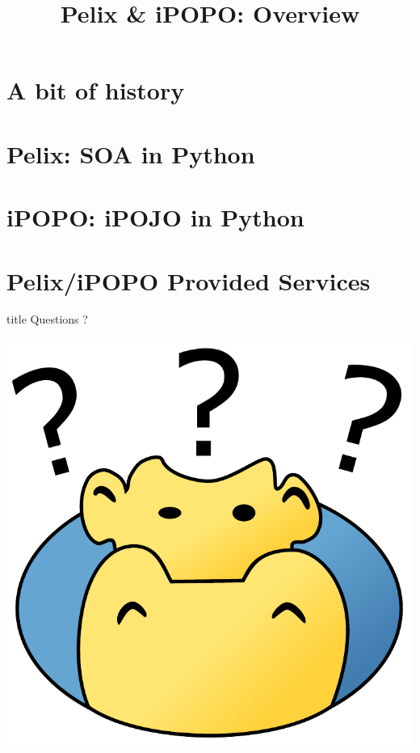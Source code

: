 \documentclass[table]{beamer}
\title[Pelix \& iPOPO]{Pelix \& iPOPO: Overview}
\begin{document}
\frame{\titlepage}

\section{A bit of history}


\section{Pelix: SOA in Python}


\section{iPOPO: iPOJO in Python}


\section{Pelix/iPOPO Provided Services}


\begin{frame}
  \vfill
  \centering
  \begin{beamercolorbox}[sep=8pt,center,shadow=true,rounded=true]{title}
    Questions ?\par%
  \end{beamercolorbox}
  \vspace{3ex}
  \includegraphics[width=.6\textwidth]{../imgs/ipopo_question}
  \vfill
\end{frame}
\end{document}
